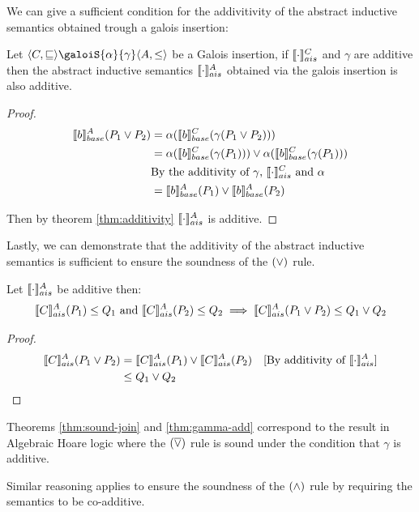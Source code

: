 \documentclass[
  10pt,       %
  twoside,    %
  a4paper,    %
  english,    %
  tikz,       %
  openright,  %
]{book}
\begin{document}
We can give a sufficient condition for the addivitivity of the abstract 
inductive semantics obtained trough a galois insertion:
\begin{theorem}
  \label{thm:gamma-add}
  Let $\langle C, \sqsubseteq \rangle \galoiS{\alpha}{\gamma} \langle A, \leq 
  \rangle$ be a Galois insertion, if $\asem[C]{\cdot}$ and $\gamma$ are 
  additive then the abstract inductive semantics $\asem[A]{\cdot}$ obtained
  via the galois insertion is also additive.
\end{theorem}
\begin{proof}
  \begin{align*}
    \bsem{b}^A(P_1 \join P_2)
      &= \alpha(\bsem{b}^C(\gamma(P_1 \join P_2))) \\
      &= \alpha(\bsem{b}^C(\gamma(P_1))) \join\alpha(\bsem{b}^C(\gamma(P_1))) \\
      &\text{By the additivity of $\gamma$, $\asem[C]{\cdot}$ and $\alpha$}\\
      &= \bsem{b}^A(P_1) \join \bsem{b}^A(P_2)
  \end{align*}

  Then by theorem \ref{thm:additivity} $\asem{\cdot}$ is additive.
\end{proof}

Lastly, we can demonstrate that the additivity of the abstract inductive
semantics is sufficient to ensure the soundness of the $(\join)$ rule.

\begin{theorem}
  \label{thm:sound-join}
  Let $\asem{\cdot}$ be additive then:
  $$\asem{C}(P_1) \leq Q_1 \text{ and } \asem{C}(P_2) \leq Q_2 \implies
  \asem{C}(P_1 \join P_2) \leq Q_1 \join Q_2$$
\end{theorem}
\begin{proof}
  \begin{align*}
    \asem{C}(P_1 \join P_2)
      &= \asem{C}(P_1) \join \asem{C}(P_2)
      &\text{[By additivity of $\asem{\cdot}$]} \\
      &\leq Q_1 \join Q_2
  \end{align*}
\end{proof}

Theorems \ref{thm:sound-join} and \ref{thm:gamma-add} correspond to the result
in Algebraic Hoare logic where the $(\overline{\join})$ rule is sound under the
condition that $\gamma$ is additive.

Similar reasoning applies to ensure the soundness of the $(\meet)$ rule by
requiring the semantics to be co-additive.
\end{document}
